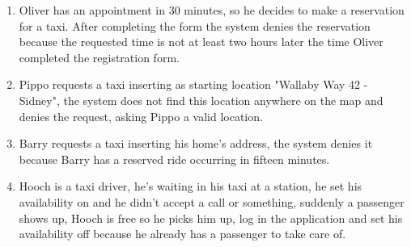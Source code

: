 \begin{enumerate}
	\item Oliver has an appointment in 30 minutes, so he decides to make a reservation for a taxi. After completing the form the system denies the reservation because the requested time is not at least two hours later the time Oliver completed the registration form.
	\item Pippo requests a taxi inserting as starting location "Wallaby Way 42 - Sidney", the system does not find this location anywhere on the map and denies the request, asking Pippo a valid location.
	\item Barry requests a taxi inserting his home's address, the system denies it because Barry has a reserved ride occurring in fifteen minutes.
	\item Hooch is a taxi driver, he's waiting in his taxi at a station, he set his availability on and he didn't accept a call or something, suddenly a passenger shows up, Hooch is free so he picks him up, log in the application and set his availability off because he already has a passenger to take care of.
\end{enumerate}